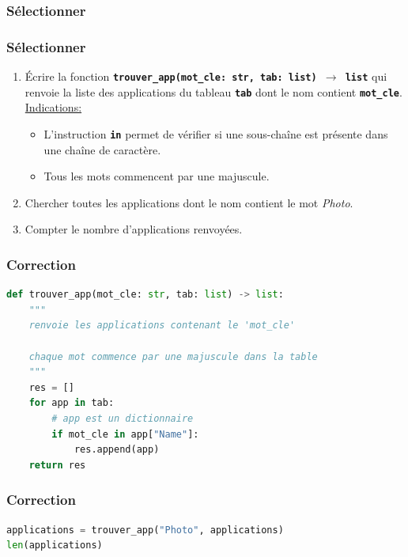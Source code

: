 \documentclass[svgnames,11pt]{beamer}
\begin{document}
\subsubsection{Sélectionner}
\begin{frame}
    \frametitle{Sélectionner}

    \begin{activite}
        \begin{enumerate}
            \item Écrire la fonction \textbf{\texttt{trouver\_app(mot\_cle: str, tab: list) $\rightarrow$ list}} qui renvoie la liste des applications du tableau \texttt{\textbf{tab}} dont le nom contient \texttt{\textbf{mot\_cle}}. \underline{Indications:} 
            \begin{itemize}
                \item L'instruction \textbf{\texttt{in}} permet de vérifier si une sous-chaîne est présente dans une chaîne de caractère.
                \item Tous les mots commencent par une majuscule.
            \end{itemize}
            \item Chercher toutes les applications dont le nom contient le mot \emph{Photo}.
            \item Compter le nombre d'applications renvoyées.
        \end{enumerate}
    \end{activite}

\end{frame}
\begin{frame}[fragile]
    \frametitle{Correction}

\begin{center}
\begin{lstlisting}[language=Python , basicstyle=\ttfamily\small, xleftmargin=.5em, xrightmargin=0em]
def trouver_app(mot_cle: str, tab: list) -> list:
    """
    renvoie les applications contenant le 'mot_cle'

    chaque mot commence par une majuscule dans la table
    """
    res = []
    for app in tab:
        # app est un dictionnaire
        if mot_cle in app["Name"]:
            res.append(app)
    return res
\end{lstlisting}
\end{center}

\end{frame}
\begin{frame}[fragile]
    \frametitle{Correction}

    \begin{center}
        \begin{lstlisting}[language=Python, basicstyle=\ttfamily\small, xleftmargin=1em, xrightmargin=0em]
applications = trouver_app("Photo", applications)
len(applications)
\end{lstlisting}
    \end{center}
\end{frame}
\end{document}
